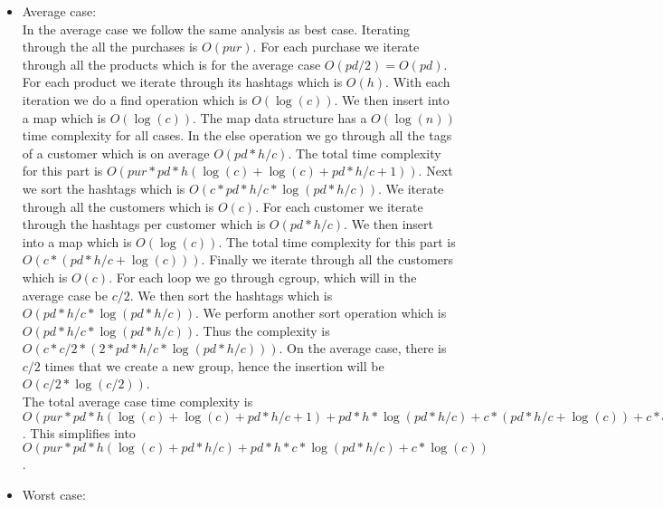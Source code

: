 \documentclass[12pt]{article}
\begin{document}
\begin{itemize}
    \item Average case: \\ In the average case we follow the same analysis as best case. Iterating through the all the purchases is $O(pur)$. For each purchase we iterate through all the products which is for the average case $O(pd/2) = O(pd)$. For each product we iterate through its hashtags which is $O(h)$. With each iteration we do a find operation which is $O(\log(c))$. We then insert into a map which is $O(\log(c))$. The map data structure has a $O(\log(n))$ time complexity for all cases. In the else operation we go through all the tags of a customer which is on average $O(pd*h/c)$. The total time complexity for this part is $O(pur*pd*h(\log(c) + \log(c) + pd*h/c + 1))$. Next we sort the hashtags which is $O(c*pd*h/c*\log(pd*h/c))$. We iterate through all the customers which is $O(c)$. For each customer we iterate through the hashtags per customer which is $O(pd*h/c)$. We then insert into a map which is $O(\log(c))$. The total time complexity for this part is $O(c*(pd*h/c + \log(c)))$. Finally we iterate through all the customers which is $O(c)$. For each loop we go through cgroup, which will in the average case be $c/2$. We then sort the hashtags which is $O(pd*h/c*\log(pd*h/c))$. We perform another sort operation which is $O(pd*h/c*\log(pd*h/c))$. Thus the complexity is $O(c*c/2*(2 * pd*h/c * \log(pd*h/c)))$. On the average case, there is $c/2$ times that we create a new group, hence the insertion will be $O(c/2*\log(c/2))$.\\
    The total average case time complexity is $O(pur*pd*h(\log(c) + \log(c) + pd*h/c + 1) + pd*h*\log(pd*h/c) + c*(pd*h/c + \log(c)) + c*c/2*(2 * pd*h/c * \log(pd*h/c)) + c/2*\log(c/2))$. This simplifies into $O(pur*pd*h(\log(c) + pd*h/c) + pd*h*c* \log(pd*h/c) + c*\log(c))$.
    \item Worst case: \\ 

\end{itemize}
\end{document}
